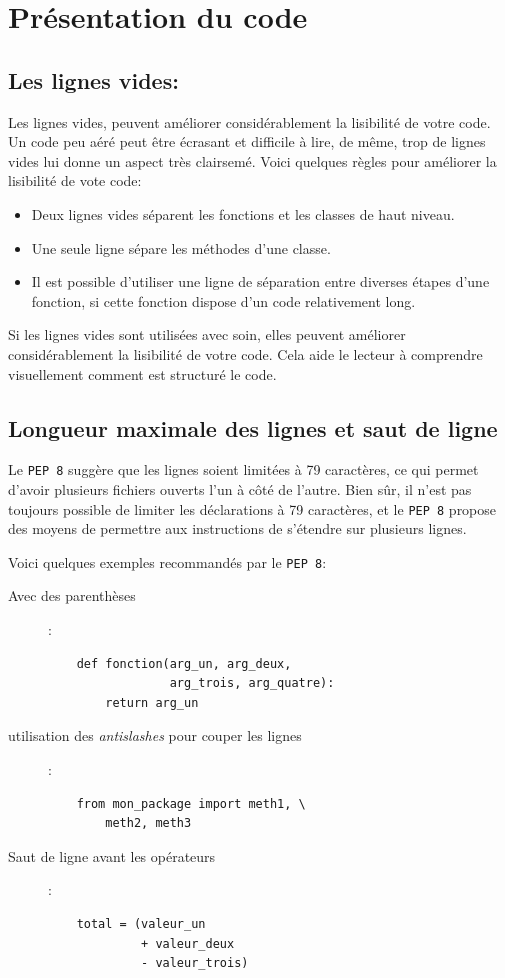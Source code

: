 \documentclass[a4paper,12pt]{book}
\begin{document}
\section{Présentation du code}
\subsection*{Les lignes vides:}
Les lignes vides, peuvent améliorer considérablement la lisibilité de votre code. Un code peu aéré peut être écrasant et difficile à lire, de même, trop de lignes vides lui donne un aspect très clairsemé. Voici quelques règles pour améliorer la lisibilité de vote code:
\begin{itemize}
	\item Deux lignes vides séparent les fonctions et les classes de haut niveau.
	\item Une seule ligne sépare les méthodes d'une classe.
	\item Il est possible d'utiliser une ligne de séparation entre diverses étapes d'une fonction, si cette fonction dispose d'un code relativement long.
\end{itemize}
\medskip

Si les lignes vides sont utilisées avec soin, elles peuvent améliorer considérablement la lisibilité de votre code. Cela aide le lecteur à comprendre visuellement comment est structuré le code. 
\medskip

\subsection*{Longueur maximale des lignes et saut de ligne}
Le \texttt{PEP 8} suggère que les lignes soient limitées à 79 caractères,  ce qui permet d'avoir plusieurs fichiers ouverts l'un à côté de l'autre. Bien sûr, il n'est pas toujours possible de limiter les déclarations à 79 caractères, et le \texttt{PEP 8} propose des moyens de permettre aux instructions de s'étendre sur plusieurs lignes.
\medskip

Voici quelques exemples recommandés par le \texttt{PEP 8}:
\begin{description}
	\item[Avec des parenthèses]: 
	\begin{lstlisting}
	def fonction(arg_un, arg_deux,
                 arg_trois, arg_quatre):
        return arg_un
	\end{lstlisting}
	\item[utilisation des \textit{antislashes} pour couper les lignes]:
	\begin{lstlisting}
	from mon_package import meth1, \
        meth2, meth3
	\end{lstlisting}
	\item[Saut de ligne avant les opérateurs]:
	\begin{lstlisting}
	total = (valeur_un
             + valeur_deux
             - valeur_trois)
	\end{lstlisting}
\end{description}
\medskip
\end{document}

